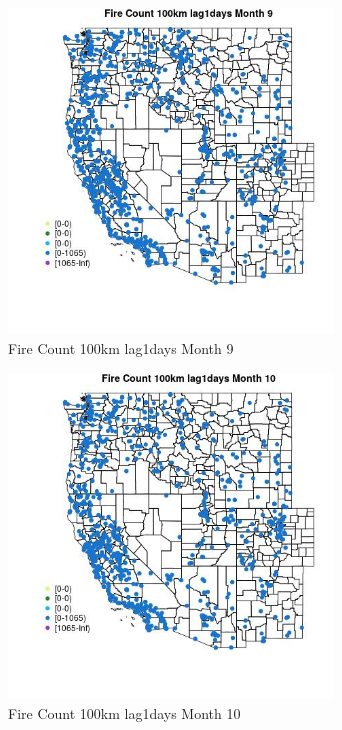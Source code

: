 \begin{figure} 
\centering  
\includegraphics[width=0.77\textwidth]{Code_Outputs/Report_ML_input_PM25_Step4_part_f_de_duplicated_aves_prioritize_24hr_obswNAs_MapObsMo9Fire_Count_100km_lag1days.jpg} 
\caption{\label{fig:Report_ML_input_PM25_Step4_part_f_de_duplicated_aves_prioritize_24hr_obswNAsMapObsMo9Fire_Count_100km_lag1days}Fire Count 100km lag1days Month 9} 
\end{figure} 
 

\begin{figure} 
\centering  
\includegraphics[width=0.77\textwidth]{Code_Outputs/Report_ML_input_PM25_Step4_part_f_de_duplicated_aves_prioritize_24hr_obswNAs_MapObsMo10Fire_Count_100km_lag1days.jpg} 
\caption{\label{fig:Report_ML_input_PM25_Step4_part_f_de_duplicated_aves_prioritize_24hr_obswNAsMapObsMo10Fire_Count_100km_lag1days}Fire Count 100km lag1days Month 10} 
\end{figure} 
 

